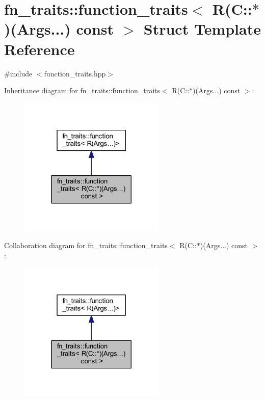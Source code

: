 \hypertarget{structfn__traits_1_1function__traits_3_01_r_07_c_1_1_5_08_07_args_8_8_8_08_01const_01_01_4}{}\section{fn\+\_\+traits\+:\+:function\+\_\+traits$<$ R(C\+:\+:$\ast$)(Args...) const $>$ Struct Template Reference}
\label{structfn__traits_1_1function__traits_3_01_r_07_c_1_1_5_08_07_args_8_8_8_08_01const_01_01_4}


{\ttfamily \#include $<$function\+\_\+traits.\+hpp$>$}



Inheritance diagram for fn\+\_\+traits\+:\+:function\+\_\+traits$<$ R(C\+:\+:$\ast$)(Args...) const $>$\+:\nopagebreak
\begin{figure}[H]
\begin{center}
\leavevmode
\includegraphics[width=197pt]{d2/dda/structfn__traits_1_1function__traits_3_01_r_07_c_1_1_5_08_07_args_8_8_8_08_01const_01_01_4__inherit__graph}
\end{center}
\end{figure}


Collaboration diagram for fn\+\_\+traits\+:\+:function\+\_\+traits$<$ R(C\+:\+:$\ast$)(Args...) const $>$\+:\nopagebreak
\begin{figure}[H]
\begin{center}
\leavevmode
\includegraphics[width=197pt]{d7/d7f/structfn__traits_1_1function__traits_3_01_r_07_c_1_1_5_08_07_args_8_8_8_08_01const_01_01_4__coll__graph}
\end{center}
\end{figure}
